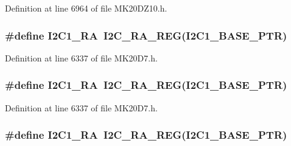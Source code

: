 Definition at line 6964 of file M\+K20\+D\+Z10.\+h.

\subsubsection[{\texorpdfstring{I2\+C1\+\_\+\+RA}{I2C1_RA}}]{\setlength{\rightskip}{0pt plus 5cm}\#define I2\+C1\+\_\+\+RA~{\bf I2\+C\+\_\+\+R\+A\+\_\+\+R\+EG}({\bf I2\+C1\+\_\+\+B\+A\+S\+E\+\_\+\+P\+TR})}\hypertarget{group___i2_c___register___accessor___macros_ga15eb9a112bb86d26c32d17ebfb3dcecc}{}\label{group___i2_c___register___accessor___macros_ga15eb9a112bb86d26c32d17ebfb3dcecc}


Definition at line 6337 of file M\+K20\+D7.\+h.

\subsubsection[{\texorpdfstring{I2\+C1\+\_\+\+RA}{I2C1_RA}}]{\setlength{\rightskip}{0pt plus 5cm}\#define I2\+C1\+\_\+\+RA~{\bf I2\+C\+\_\+\+R\+A\+\_\+\+R\+EG}({\bf I2\+C1\+\_\+\+B\+A\+S\+E\+\_\+\+P\+TR})}\hypertarget{group___i2_c___register___accessor___macros_ga15eb9a112bb86d26c32d17ebfb3dcecc}{}\label{group___i2_c___register___accessor___macros_ga15eb9a112bb86d26c32d17ebfb3dcecc}


Definition at line 6337 of file M\+K20\+D7.\+h.

\subsubsection[{\texorpdfstring{I2\+C1\+\_\+\+RA}{I2C1_RA}}]{\setlength{\rightskip}{0pt plus 5cm}\#define I2\+C1\+\_\+\+RA~{\bf I2\+C\+\_\+\+R\+A\+\_\+\+R\+EG}({\bf I2\+C1\+\_\+\+B\+A\+S\+E\+\_\+\+P\+TR})}\hypertarget{group___i2_c___register___accessor___macros_ga15eb9a112bb86d26c32d17ebfb3dcecc}{}\label{group___i2_c___register___accessor___macros_ga15eb9a112bb86d26c32d17ebfb3dcecc}


